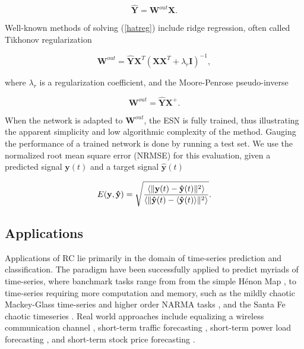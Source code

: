 \begin{equation}
  \mathbf{\hat{Y}} = \mathbf{W}^{out}\mathbf{X}.
  \label{hatreg}
\end{equation}

Well-known methods of solving (\ref{hatreg}) include ridge regression, often
called Tikhonov regularization

\begin{equation}
  \mathbf{W}^{out} = \mathbf{\hat{Y}}\mathbf{X}^{T}
                    (\mathbf{X}\mathbf{X}^{T} + \lambda_{r}\mathbf{I})^{-1},
  \label{tikhonov}
\end{equation}

\noindent where $\lambda_{r}$ is a regularization coefficient, and the
Moore-Penrose pseudo-inverse

\begin{equation}
  \mathbf{W}^{out} = \mathbf{\hat{Y}}\mathbf{X}^{+}.
  \label{pseudo}
\end{equation}

When the network is adapted to $\mathbf{W}^{out}$, the ESN is fully trained,
thus illustrating the apparent simplicity and low algorithmic complexity of the
method. Gauging the performance of a trained network is done by running a test
set. We use the normalized root mean square error (NRMSE) for this evaluation,
given a predicted signal $\mathbf{y}(t)$ and a target signal
$\mathbf{\hat{y}}(t)$

\begin{equation}
  E(\mathbf{y}, \mathbf{\hat{y}}) = \sqrt{\frac{
      \langle\Vert \mathbf{y}(t) - \mathbf{\hat{y}}(t) \Vert^{2}\rangle
    }{
      \langle\Vert \mathbf{\hat{y}}(t) - \langle\mathbf{\hat{y}}(t)\rangle \Vert^{2}\rangle
    }
  }
  .
  \label{nrmse}
\end{equation}


\subsection{Applications}

Applications of RC lie primarily in the domain of time-series prediction and
classification. The paradigm have been successfully applied to predict myriads
of time-series, where banchmark tasks range from from the simple H\'enon Map
\cite{goudarzi_comparative_2014}, to time-series requiring more computation and
memory, such as the mildly chaotic Mackey-Glass time-series and higher order
NARMA tasks \cite{alippi_quantification_2009}, and the Santa Fe chaotic
timeseries \cite{rodan_minimum_2011}. Real world approaches include equalizing a
wireless communication channel \cite{jaeger_harnessing_2004}, short-term traffic
forecasting \cite{an_short-term_2011}, short-term power load forecasting
\cite{song_hourly_2011}, and short-term stock price forecasting
\cite{lin_short-term_2009}.

